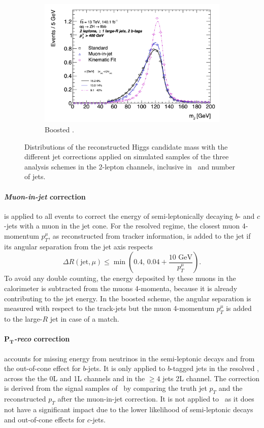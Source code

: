 \begin{figure}[h!]
\begin{subfigure}[b]{0.49\textwidth}
    \includegraphics[width=\textwidth]{Images/VH/Correct/CorrectedDist/bbB.png}
    \caption{Boosted \vhb.}
  \end{subfigure}
  \caption{Distributions of the reconstructed Higgs candidate mass with the different jet corrections applied on simulated samples of the three analysis schemes in the 2-lepton channels, inclusive in \ptv\ and number of jets.}
  \label{fig:CorrResults}
\end{figure} 

\paragraph{\textit{Muon-in-jet} correction} is applied to all events to correct the energy of semi-leptonically decaying $b$- and $c$-jets with a muon in the jet cone. For the resolved regime, the closest muon 4-momentum $p_T^{\mu}$, as reconstructed from tracker information, is added to the jet if its angular separation from the jet axis respects \[\Delta R(\textrm{jet}, \mu) \leq \min\left(0.4, \,0.04 + \frac{10 \textrm{ GeV}}{p_T^{\mu}}\right).\] To avoid any double counting, the energy deposited by these muons in the calorimeter is subtracted from the muons 4-momenta, because it is already contributing to the jet energy. In the boosted scheme, the angular separation is measured with respect to the track-jets but the muon 4-momentum $p_T^{\mu}$ is added to the large-$R$ jet in case of a match.

\paragraph{\textit{$\boldsymbol{P_T}$-reco} correction} accounts for missing energy from neutrinos in the semi-leptonic decays and from the out-of-cone effect for $b$-jets. It is only applied to $b$-tagged jets in the resolved \vhb, across the the 0L and 1L channels and in the $\geq4$ jets 2L channel. The correction is derived from the signal samples of \vhb\ by comparing the truth jet $p_T$ and the reconstructed $p_T$ after the muon-in-jet correction. It is not applied to \vhc\ as it does not have a significant impact due to the lower likelihood of semi-leptonic decays and out-of-cone effects for $c$-jets.

